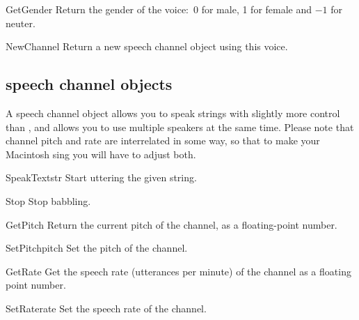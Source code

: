 \begin{funcdesc}{GetGender}{}
Return the gender of the voice:\ 0 for male, 1 for female and $-1$ for neuter.
\end{funcdesc}

\begin{funcdesc}{NewChannel}{}
Return a new speech channel object using this voice.
\end{funcdesc}

\subsection{speech channel objects}
A speech channel object allows you to speak strings with slightly more
control than , and allows you to use multiple
speakers at the same time. Please note that channel pitch and rate are
interrelated in some way, so that to make your Macintosh sing you will
have to adjust both.

\renewcommand{\indexsubitem}{(speech channel object method)}
\begin{funcdesc}{SpeakText}{str}
Start uttering the given string.
\end{funcdesc}

\begin{funcdesc}{Stop}{}
Stop babbling.
\end{funcdesc}

\begin{funcdesc}{GetPitch}{}
Return the current pitch of the channel, as a floating-point number.
\end{funcdesc}

\begin{funcdesc}{SetPitch}{pitch}
Set the pitch of the channel.
\end{funcdesc}

\begin{funcdesc}{GetRate}{}
Get the speech rate (utterances per minute) of the channel as a
floating point number.
\end{funcdesc}

\begin{funcdesc}{SetRate}{rate}
Set the speech rate of the channel.
\end{funcdesc}

